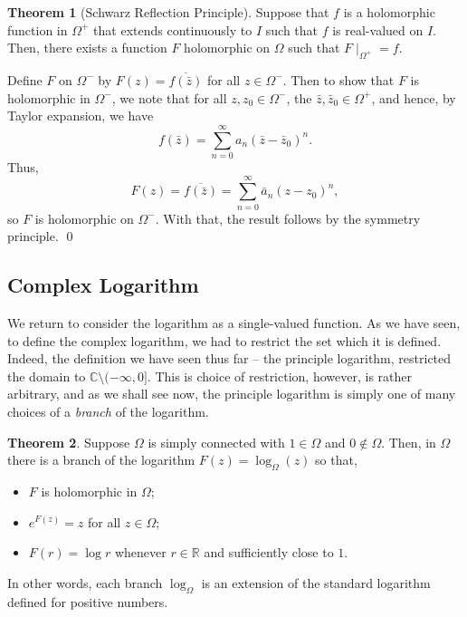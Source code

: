 \documentclass[
]{article}
\theoremstyle{definition}
\newtheorem{theorem}{Theorem}
\theoremstyle{definition}
\begin{document}
\begin{theorem}[Schwarz Reflection Principle]
  Suppose that \(f\) is a holomorphic function in \(\Omega^+\) that extends 
  continuously to \(I\) such that \(f\) is real-valued on \(I\). Then, there exists 
  a function \(F\) holomorphic on \(\Omega\) such that \(F \mid_{\Omega^+} = f\).
\end{theorem}
\proof

Define \(F\) on \(\Omega^-\) by \(F(z) = \overline{f(\bar z)}\) for all
\(z \in \Omega^-\). Then to show that \(F\) is holomorphic in
\(\Omega^-\), we note that for all \(z, z_0 \in \Omega^-\), the
\(\bar z, \bar z_0 \in \Omega^+\), and hence, by Taylor expansion, we
have \[f(\bar z) = \sum_{n = 0}^\infty a_n (\bar z - \bar z_0)^n.\]
Thus,
\[F(z) = \overline{f(\bar z)} = \sum_{n = 0}^\infty \bar a_n(z - z_0)^n,\]
so \(F\) is holomorphic on \(\Omega^-\). With that, the result follows
by the symmetry principle. \qed

\hypertarget{complex-logarithm}{%
\subsection{Complex Logarithm}\label{complex-logarithm}}

We return to consider the logarithm as a single-valued function. As we
have seen, to define the complex logarithm, we had to restrict the set
which it is defined. Indeed, the definition we have seen thus far -- the
principle logarithm, restricted the domain to
\(\mathbb{C} \setminus (-\infty, 0]\). This is choice of restriction,
however, is rather arbitrary, and as we shall see now, the principle
logarithm is simply one of many choices of a \emph{branch} of the
logarithm.

\begin{theorem}
  Suppose \(\Omega\) is simply connected with \(1 \in \Omega\) and \(0 \not\in \Omega\). 
  Then, in \(\Omega\) there is a branch of the logarithm \(F(z) = \log_\Omega(z)\) 
  so that,
  \begin{itemize}
    \item \(F\) is holomorphic in \(\Omega\);
    \item \(e^{F(z)} = z\) for all \(z \in \Omega\);
    \item \(F(r) = \log r\) whenever \(r \in \mathbb{R}\) and sufficiently close 
      to \(1\).
  \end{itemize}
\end{theorem}

In other words, each branch \(\log_\Omega\) is an extension of the
standard logarithm defined for positive numbers.
\end{document}

